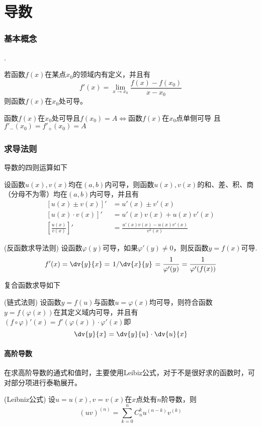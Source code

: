 \part{导数}
\section{基本概念}
.
\begin{definition}
    若函数$f(x)$在某点$x_0$的领域内有定义，并且有
    \[ f'(x) = \lim_{x \to x_0} \frac{f(x)-f(x_0)}{x-x_0} \]
    则函数$f(x)$在$x_0$处可导。
\end{definition}

\begin{theorem}
    函数$f(x)$在$x_0$处可导且$f(x_0) = A \iff$函数$f(x)$在$x_0$点单侧可导
    且$f'_-(x_0)=f'_+(x_0)=A$
\end{theorem}


\section{求导法则}
导数的四则运算如下
\begin{theorem}
    设函数$u(x), v(x)$均在$(a,b)$内可导，则函数$u(x), v(x)$的和、差、积、商（分母不为零）均在$(a,b)$内可导，并且有
    \begin{align}
        \left[u(x) \pm v(x) \right]'      & = u'(x) \pm v'(x)                      \\
        \left[ u(x) \cdot v(x) \right]'   & = u'(x)v(x) + u(x)v'(x)                \\
        \left[ \frac{u(x)}{v(x)} \right]' & = \frac{u'(x)v(x) - u(x)v'(x)}{v^2(x)}
    \end{align}
\end{theorem}

\begin{theorem}
    (反函数求导法则)
    \label{th:反函数求导法则}
    设函数$\varphi (y)$可导，如果$\varphi'(y) \neq 0$，则反函数$y=f(x)$可导.
    \[ f'(x) = \dv{y}{x} = \left. 1 \middle / \dv{x}{y}\right. = \frac{1}{\varphi'(y)} = \frac{1}{\varphi'(f(x))} \]
\end{theorem}
复合函数求导如下
\begin{theorem}
    (链式法则)
    \label{th:链式法则}
    设函数$y=f(u)$与函数$u=\varphi(x)$均可导，则符合函数$y=f(\varphi(x))$在其定义域内可导，并且有$(f\circ\varphi)'(x)=f'(\varphi(x))\cdot\varphi'(x)$即
    \[ \dv{y}{x} = \dv{y}{u} \cdot \dv{u}{x} \]
\end{theorem}

\subsection{高阶导数}
在求高阶导数的通式和值时，主要使用Leibiz公式，对于不是很好求的函数时，可对部分项进行泰勒展开。
\begin{theorem}
    (Leibniz公式)
    \label{th:Leibniz公式}
    设$u=u(x),v=v(x)$在$x$点处有$n$阶导数，则
    \[ (uv)^{(n)} = \sum^n_{k=0}C^k_n u^{(n-k)}v^{(k)} \]
\end{theorem}

